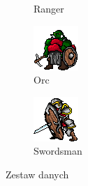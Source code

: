 \begin{figure}[!htb]
\begin{subfigure}[b]{0.2\textwidth}
        \caption{Ranger}
    \end{subfigure}
    \begin{subfigure}[b]{0.4\textwidth}
        \centering
        \includegraphics[width=\textwidth]{images/data_set/64x64_orc.png}
        \caption{Orc}
    \end{subfigure}
    \begin{subfigure}[b]{0.4\textwidth}
        \centering
        \includegraphics[width=\textwidth]{images/data_set/64x64_swordsman.png}
        \caption{Swordsman}
    \end{subfigure}
    \caption{Zestaw danych}
\end{figure}
